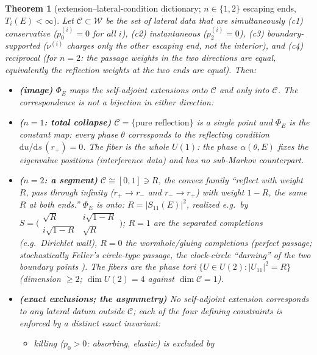 \documentclass[11pt]{article}
\newtheorem{theorem}{Theorem}
\theoremstyle{remark}
\newcommand{\dd}{\mathrm{d}}
\begin{document}
\begin{theorem}[extension--lateral-condition dictionary; $n\in\{1,2\}$
escaping ends, $T_i(E)<\infty$]
\label{thm:main}
Let $\mathcal C\subset\mathcal W$ be the set of lateral data that are
simultaneously
\emph{(c1) conservative} ($p_0^{(i)}=0$ for all $i$),
\emph{(c2) instantaneous} ($p_2^{(i)}=0$),
\emph{(c3) boundary-supported} ($\nu^{(i)}$ charges only the other
escaping end, not the interior), and
\emph{(c4) reciprocal} (for $n=2$: the passage weights in the two
directions are equal, equivalently the reflection weights at the two
ends are equal).
Then:
\begin{itemize}
\item[(1)] \textbf{(image)} $\Phi_E$ maps the self-adjoint extensions
\emph{onto} $\mathcal C$ and \emph{only into} $\mathcal C$.  The
correspondence is not a bijection in either direction:
\item[(2)] \textbf{($n=1$: total collapse)} $\mathcal C=\{\text{pure
reflection}\}$ is a single point and $\Phi_E$ is the \emph{constant}
map: every phase $\theta$ corresponds to the reflecting condition
$\dd u/\dd s\,(r_+)=0$.  The fiber is the whole $U(1)$: the phase
$\alpha(\theta,E)$ fixes the eigenvalue positions (interference data)
and has no sub-Markov counterpart.
\item[(3)] \textbf{($n=2$: a segment)} $\mathcal C\cong[0,1]\ni R$,
the convex family ``reflect with weight $R$, pass through infinity
($r_+\!\to r_-$ and $r_-\!\to r_+$) with weight $1-R$, the same $R$ at
both ends.''  $\Phi_E$ is onto: $R=|S_{11}(E)|^2$, realized e.g.\ by
$S=\bigl(\begin{smallmatrix}\sqrt R& i\sqrt{1-R}\\
i\sqrt{1-R}&\sqrt R\end{smallmatrix}\bigr)$; $R=1$ are the separated
completions (e.g.\ Dirichlet wall), $R=0$ the wormhole/gluing
completions (perfect passage; stochastically Feller's circle-type
passage, the clock-circle ``darning'' of the two boundary points
\cite{ChenFukushima}).  The fibers are the phase tori
$\{U\in U(2):|U_{11}|^2=R\}$ (dimension $\ge2$; $\dim U(2)=4$ against
$\dim\mathcal C=1$).
\item[(4)] \textbf{(exact exclusions; the asymmetry)}  No self-adjoint
extension corresponds to any lateral datum outside $\mathcal C$; each
of the four defining constraints is enforced by a distinct exact
invariant:
\begin{itemize}
\item[(c1)] \emph{killing} ($p_0>0$: absorbing, elastic) is excluded by

\end{itemize}
\end{itemize}
\end{theorem}
\end{document}
